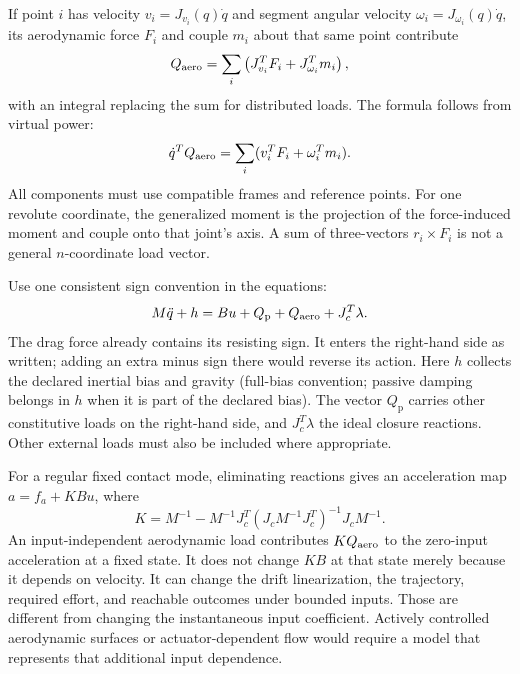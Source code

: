 If point $i$ has velocity $v_i=J_{v_i}(q)\dot q$ and segment angular velocity
$\omega_i=J_{\omega_i}(q)\dot q$, its aerodynamic force $F_i$ and couple
$m_i$ about that same point contribute
\begin{equation}
 Q_{\rm aero}=\sum_i\left(J_{v_i}^TF_i+J_{\omega_i}^Tm_i\right),
 \label{eq:lumped-drag}
\end{equation}
with an integral replacing the sum for distributed loads. The formula follows
from virtual power:
\begin{equation}
 \dot q^TQ_{\rm aero}=\sum_i(v_i^TF_i+\omega_i^Tm_i).
 \label{eq:aero_virtual_power}
\end{equation}
All components must use compatible frames and reference points. For one
revolute coordinate, the generalized moment is the projection of the
force-induced moment and couple onto that joint's axis. A sum of three-vectors
$r_i\times F_i$ is not a general $n$-coordinate load vector.

Use one consistent sign convention in the equations:
\begin{equation}
 M\ddot q+h=Bu+Q_{\mathrm{p}}+Q_{\rm aero}+J_c^T\lambda.
 \label{eq:eom-with-drag}
\end{equation}
The drag force already contains its resisting sign. It enters the right-hand
side as written; adding an extra minus sign there would reverse its action.
Here $h$ collects the declared inertial bias and gravity (full-bias convention;
passive damping belongs in $h$ when it is part of the declared bias). The
vector $Q_{\mathrm{p}}$ carries other constitutive loads on the right-hand side,
and $J_c^T\lambda$ the ideal closure reactions. Other external loads
must also be included where appropriate.

For a regular fixed contact mode, eliminating reactions gives an acceleration
map $a=f_a+KB u$, where
\begin{equation}
 K=M^{-1}-M^{-1}J_c^T(J_cM^{-1}J_c^T)^{-1}J_cM^{-1}.
 \label{eq:drag_constrained_projection}
\end{equation}
An input-independent aerodynamic load contributes $KQ_{\rm aero}$ to the
zero-input acceleration at a fixed state. It does not change $KB$ at that
state merely because it depends on velocity. It can change the drift
linearization, the trajectory, required effort, and reachable outcomes under
bounded inputs. Those are different from changing the instantaneous input
coefficient. Actively controlled aerodynamic surfaces or actuator-dependent
flow would require a model that represents that additional input dependence.


